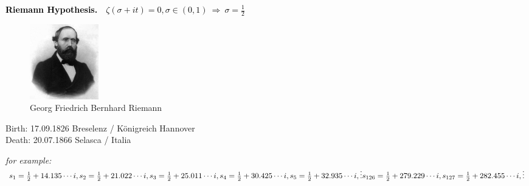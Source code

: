 \documentclass[landscape,display]{powersem} %
\newcommand{\heading}[1]{%
 \begin{center}
  \large\bf
  \shadowbox{{\textcolor{conceptcolor}{#1}}}%
 \end{center}
 \vspace{1ex minus 1ex}}
\begin{document}
\begin{slide}
\heading{Some conjectures regarding prime numbers: 5/5 }

\textcolor{black}{\textbf{Riemann Hypothesis.}\ \ $\zeta(\sigma+it)=0, \sigma\in(0,1)\ \Rightarrow\ \sigma=\frac12$}\pause

\begin{figure}
 \hspace*{1cm}\includegraphics[width=3cm]{images/riemann.jpeg}\\
  {Georg Friedrich Bernhard Riemann}\end{figure}
\vspace*{-0.6cm}\begin{tiny}Birth: 17.09.1826  Breselenz / K\"onigreich Hannover\\
\vspace*{-0.5cm}Death: 20.07.1866  Selasca / Italia
\end{tiny}\pause

\vspace*{-4cm}\hspace*{7cm}
\begin{minipage}{6cm}
\textit{for example:}\\ 
$s_1=\frac12+ 14.135\cdots i,\\ 
s_2=\frac12+21.022\cdots i,\\ 
s_3=\frac12+25.011\cdots i,\\
s_4=\frac12+30.425\cdots i,\\
s_5=\frac12+32.935\cdots i,\\
\vdots\\
s_{126}=\frac12+279.229\cdots i,\\
s_{127}=\frac12+282.455\cdots i,\\
\vdots$\end{minipage}
\end{slide}
\end{document}
